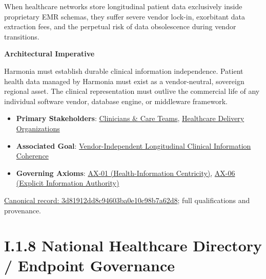When healthcare networks store longitudinal patient data exclusively inside proprietary EMR schemas, they suffer severe vendor lock-in, exorbitant data extraction fees, and the perpetual risk of data obsolescence during vendor transitions.



\par\medskip\textbf{Architectural Imperative}\par


Harmonia must establish durable clinical information independence. Patient health data managed by Harmonia must exist as a vendor-neutral, sovereign regional asset. The clinical representation must outlive the commercial life of any individual software vendor, database engine, or middleware framework.



\begin{itemize}


\item \textbf{Primary Stakeholders}: \href{\detokenize{../../../../../docs/markdown/01-motivation/stakeholders/enterprise-stakeholders.md}}{Clinicians \& Care Teams}, \href{\detokenize{../../../../../docs/markdown/01-motivation/stakeholders/enterprise-stakeholders.md}}{Healthcare Delivery Organizations}

\item \textbf{Associated Goal}: \href{\detokenize{../../../../../docs/markdown/01-motivation/goals-outcomes/strategic-goals.md}}{Vendor-Independent Longitudinal Clinical Information Coherence}

\item \textbf{Governing Axioms}: \hyperref[element:e9bd61acaaea4577bc4086a5639e52c3]{AX-01 (Health-Information Centricity)}, \hyperref[element:952c3b6148ce4fce94b69f99a0c2fec7]{AX-06 (Explicit Information Authority)}

\end{itemize}

{\footnotesize \href{../../../../continuum/motivation/driver/3d81912dd8c94603ba0e10c98b7a62d8.md}{Canonical record: 3d81912dd8c94603ba0e10c98b7a62d8}; full qualifications and provenance.}\par
\section*{I.1.8 National Healthcare Directory / Endpoint Governance}
\label{navigation:I.1.8}

